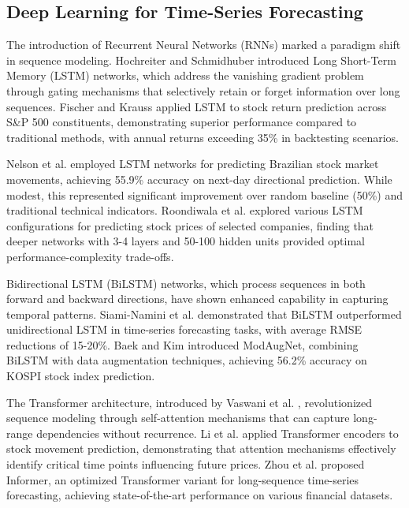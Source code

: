 \documentclass[conference]{IEEEtran}
\begin{document}
\subsection{Deep Learning for Time-Series Forecasting}

The introduction of Recurrent Neural Networks (RNNs) marked a paradigm shift in sequence modeling. Hochreiter and Schmidhuber \cite{hochreiter1997long} introduced Long Short-Term Memory (LSTM) networks, which address the vanishing gradient problem through gating mechanisms that selectively retain or forget information over long sequences. Fischer and Krauss \cite{fischer2018deep} applied LSTM to stock return prediction across S\&P 500 constituents, demonstrating superior performance compared to traditional methods, with annual returns exceeding 35\% in backtesting scenarios.

Nelson et al. \cite{nelson2017stock} employed LSTM networks for predicting Brazilian stock market movements, achieving 55.9\% accuracy on next-day directional prediction. While modest, this represented significant improvement over random baseline (50\%) and traditional technical indicators. Roondiwala et al. \cite{roondiwala2017predicting} explored various LSTM configurations for predicting stock prices of selected companies, finding that deeper networks with 3-4 layers and 50-100 hidden units provided optimal performance-complexity trade-offs.

Bidirectional LSTM (BiLSTM) networks, which process sequences in both forward and backward directions, have shown enhanced capability in capturing temporal patterns. Siami-Namini et al. \cite{siami2018comparison} demonstrated that BiLSTM outperformed unidirectional LSTM in time-series forecasting tasks, with average RMSE reductions of 15-20\%. Baek and Kim \cite{baek2018modaugnet} introduced ModAugNet, combining BiLSTM with data augmentation techniques, achieving 56.2\% accuracy on KOSPI stock index prediction.

The Transformer architecture, introduced by Vaswani et al. \cite{vaswani2017attention}, revolutionized sequence modeling through self-attention mechanisms that can capture long-range dependencies without recurrence. Li et al. \cite{li2019enhancing} applied Transformer encoders to stock movement prediction, demonstrating that attention mechanisms effectively identify critical time points influencing future prices. Zhou et al. \cite{zhou2021informer} proposed Informer, an optimized Transformer variant for long-sequence time-series forecasting, achieving state-of-the-art performance on various financial datasets.
\end{document}
